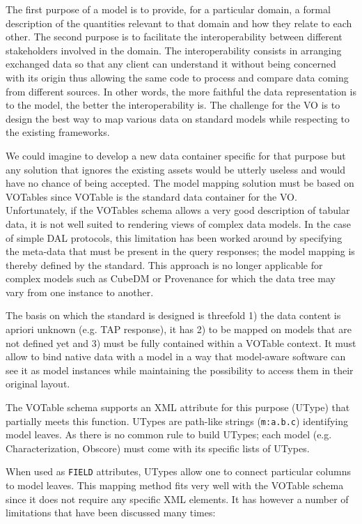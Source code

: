 
The first purpose of a model is to provide, for a particular domain, a formal description of the quantities relevant to that domain and how they relate to each other.
The second purpose is to facilitate the interoperability between  different stakeholders involved in the domain. The interoperability consists in arranging exchanged data 
so that any client can understand it without being concerned with its origin thus allowing the same code to process and compare data coming from different sources.  
In other words, the more faithful the data representation is to the model, the better the interoperability is.
The challenge for the VO is to design the best way to map various data on standard models while respecting to the existing frameworks.

We could imagine to develop a new data container specific for that purpose but any solution that ignores the existing assets would be utterly useless and would have no chance of being accepted.
The model mapping solution must be based on VOTables since VOTable  \citep{2019ivoa.spec.1021O} is the standard data container for the VO.
Unfortunately, if the VOTables schema allows a very good description of tabular data, it is not well suited to rendering views of complex data models.
In the case of simple DAL protocols, this limitation has been worked around by specifying the meta-data that must be present in the query responses; the model mapping is thereby defined by the standard.
This approach is no longer applicable for complex models such as CubeDM or Provenance for which the data tree may vary from one instance to another.

The basis on which the standard is designed is threefold 1) the data content is apriori unknown (e.g. TAP response), it has 2) to be mapped on models that are not defined yet and 3) must be fully contained within a VOTable context.
It must allow to bind native data with a model in a way that model-aware software can see it as 
model instances while maintaining the possibility to access them in their original layout.

The VOTable schema supports an XML attribute for this purpose (UType) that partially meets this function. 
UTypes are path-like strings (\texttt{m:a.b.c}) identifying model leaves. As there is no common rule to build UTypes; each model (e.g. Characterization, Obscore)  must come with its specific lists of UTypes. 

When used as \texttt{FIELD} attributes, UTypes allow one to connect particular columns to model leaves. This mapping method fits very well with the VOTable schema since it does not require any specific XML elements. It has however a number of limitations that have been discussed many times:

